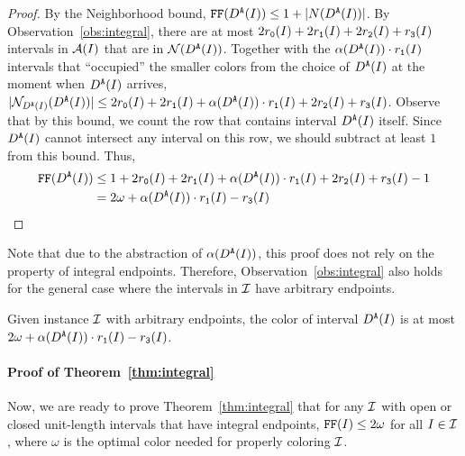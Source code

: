 \begin{proof}
    By the Neighborhood bound, $\text{\texttt{FF}}(D^\texttt{A}(I)) \leq 1+|N(D^\texttt{A}(I))|$.
    By Observation~\ref{obs:integral}, there are at most $2r_\texttt{0}(I) + 2r_\texttt{1}(I) + 2r_\texttt{2}(I) + r_\texttt{3}(I)$ intervals in $\mathcal{A}(I)$ that are in $\mathcal{N}(D^\texttt{A}(I))$. 
    Together with the $\alpha(D^\texttt{A}(I)) \cdot r_\texttt{1}(I)$ intervals that ``occupied'' the smaller colors from the choice of $D^\texttt{A}(I)$ at the moment when $D^\texttt{A}(I)$ arrives, $|\mathcal{N}_{D^\texttt{A}(I)}(D^\texttt{A}(I))| \leq 2r_\texttt{0}(I) + 2r_\texttt{1}(I) + \alpha(D^\texttt{A}(I)) \cdot r_\texttt{1}(I) + 2r_\texttt{2}(I) + r_\texttt{3}(I)$.
    Observe that by this bound, we count the row that contains interval $D^\texttt{A}(I)$ itself. 
    Since $D^\texttt{A}(I)$ cannot intersect any interval on this row, we should subtract at least $1$ from this bound.
    Thus,
    \begin{align*}
        \text{\texttt{FF}}(D^\texttt{A}(I)) &\leq 1 + 2r_\texttt{0}(I) + 2r_\texttt{1}(I) + \alpha(D^\texttt{A}(I))\cdot r_\texttt{1}(I) + 2r_\texttt{2}(I) + r_\texttt{3}(I) - 1\\
        &= 2 \omega + \alpha(D^\texttt{A}(I))\cdot r_\texttt{1}(I) - r_\texttt{3}(I)
    \end{align*}
\end{proof}

Note that due to the abstraction of $\alpha(D^\texttt{A}(I))$, this proof does not rely on the property of integral endpoints.
Therefore, Observation~\ref{obs:integral} also holds for the general case where the intervals in $\mathcal{I}$ have arbitrary endpoints.

\begin{corollary}
    \label{cor:integral_LMR}
    Given instance $\mathcal{I}$ with arbitrary endpoints, the color of interval $D^\texttt{A}(I)$ is at most $2\omega + \alpha(D^\texttt{A}(I)) \cdot r_\texttt{1}(I) - r_\texttt{3}(I)$.
\end{corollary}

\paragraph*{Proof of Theorem~\ref{thm:integral}}
Now, we are ready to prove Theorem~\ref{thm:integral} that for any $\mathcal{I}$ with open or closed unit-length intervals that have integral endpoints, $\text{\texttt{FF}}(I) \leq 2\omega$ for all $I \in \mathcal{I}$, where $\omega$ is the optimal color needed for properly coloring $\mathcal{I}$.

